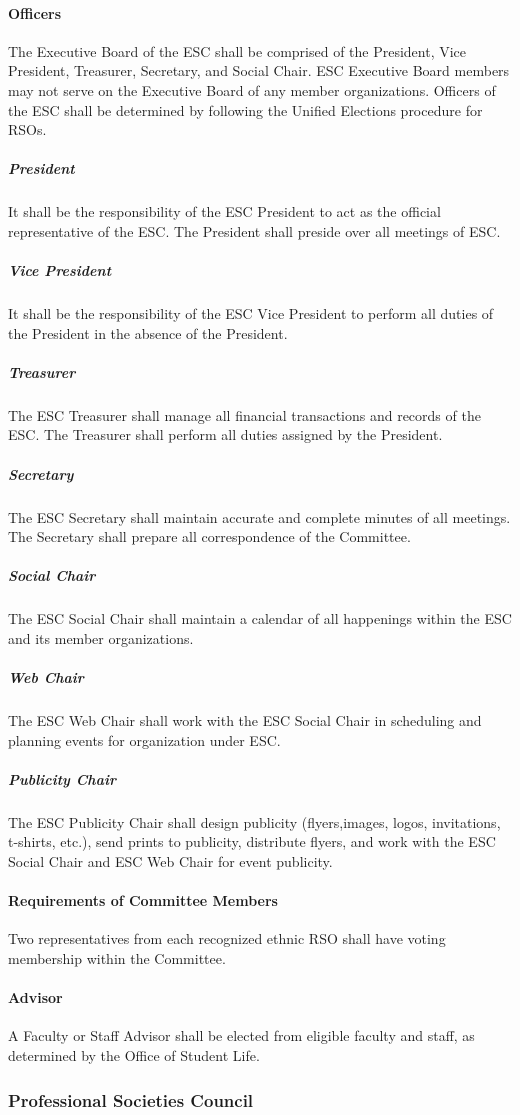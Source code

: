 \documentclass[12pt]{scrreprt}
\begin{document}
\paragraph{Officers}
The Executive Board of the ESC shall be comprised of the President, Vice 
President, Treasurer, Secretary, and Social Chair. ESC Executive Board members 
may not serve on the Executive Board of any member organizations. Officers of 
the ESC shall be determined by following the Unified Elections procedure for 
RSOs.
\subparagraph{President}
It shall be the responsibility of the ESC President to act as the official
representative of the ESC. The President shall preside over all meetings of 
ESC.
\subparagraph{Vice President}
It shall be the responsibility of the ESC Vice President to perform all duties 
of the President in the absence of the President.
\subparagraph{Treasurer}
The ESC Treasurer shall manage all financial transactions and records of the
ESC. The Treasurer shall perform all duties assigned by the President.
\subparagraph{Secretary}
The ESC Secretary shall maintain accurate and complete minutes of all
meetings. The Secretary shall prepare all correspondence of the Committee.
\subparagraph{Social Chair}
The ESC Social Chair shall maintain a calendar of all happenings within the 
ESC and its member organizations.
\subparagraph{Web Chair}
The ESC Web Chair shall work with the ESC Social Chair in scheduling and planning events for organization under ESC.
\subparagraph{Publicity Chair}
The ESC Publicity Chair shall design publicity (flyers,images, logos, invitations, t-shirts, etc.), send prints to publicity, distribute flyers, and work with the ESC Social Chair and ESC Web Chair for event publicity.

\paragraph{Requirements of Committee Members}
Two representatives from each recognized ethnic RSO shall have voting 
membership within the Committee.

\paragraph{Advisor}
A Faculty or Staff Advisor shall be elected from eligible faculty and staff, 
as determined by the Office of Student Life.

\subsubsection{Professional Societies Council}
\end{document}
